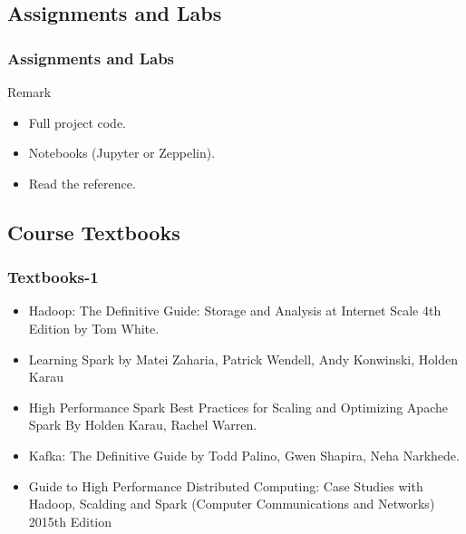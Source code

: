 
\subsection{Assignments and Labs}
\begin{frame}
\frametitle{Assignments and Labs}
\begin{block}{Remark}
\begin{itemize}
	\item<1-> Full project code.
	\item<2-> Notebooks (Jupyter or Zeppelin).
	\item<3-> Read the reference.
\end{itemize}
\end{block}
\end{frame}


\subsection{Course Textbooks}
\begin{frame}
\frametitle{Textbooks-1}
	\begin{itemize}
		\item<1-> Hadoop: The Definitive Guide: Storage and Analysis at Internet Scale 4th Edition by Tom White.
		\item<2-> Learning Spark by Matei Zaharia, Patrick Wendell, Andy Konwinski, Holden Karau
		\item<3-> High Performance Spark Best Practices for Scaling and Optimizing Apache Spark By Holden Karau, Rachel Warren.
		\item<4-> Kafka: The Definitive Guide by Todd Palino, Gwen Shapira, Neha Narkhede.
		\item<5-> Guide to High Performance Distributed Computing: Case Studies with Hadoop, Scalding and Spark (Computer Communications and Networks) 2015th Edition			
	\end{itemize}
\end{frame}


